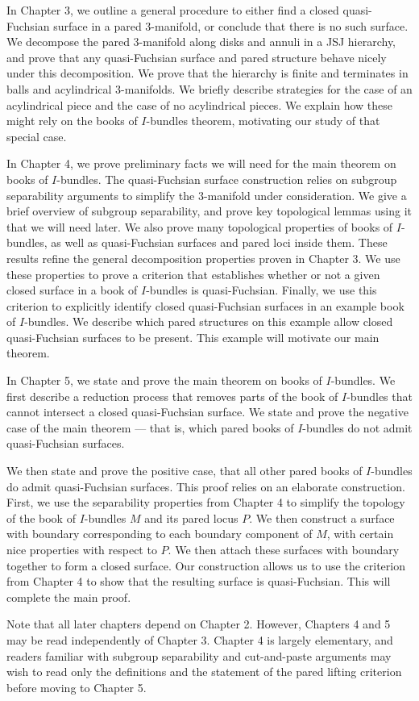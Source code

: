 In Chapter 3, we outline a general procedure to either find a closed
quasi-Fuchsian surface in a pared $3$-manifold, or conclude that there is no
such surface.  We decompose the pared $3$-manifold along disks and annuli in
a JSJ hierarchy, and prove that any quasi-Fuchsian surface and pared structure
behave nicely under this decomposition. We prove that the hierarchy is finite
and terminates in balls and acylindrical $3$-manifolds. We briefly describe
strategies for the case of an acylindrical piece and the case of no
acylindrical pieces. We explain how these might rely on the books of
$I$-bundles theorem, motivating our study of that special case.

In Chapter 4, we prove preliminary facts we will need for the main theorem on
books of $I$-bundles. The quasi-Fuchsian surface construction relies on
subgroup separability arguments to simplify the $3$-manifold under
consideration.  We give a brief overview of subgroup separability, and prove
key topological lemmas using it that we will need later. We also prove many
topological properties of books of $I$-bundles, as well as quasi-Fuchsian
surfaces and pared loci inside them.  These results refine the general
decomposition properties proven in Chapter 3.  We use these properties to prove
a criterion that establishes whether or not a given closed surface in a book of
$I$-bundles is quasi-Fuchsian.  Finally, we use this criterion to explicitly
identify closed quasi-Fuchsian surfaces in an example book of $I$-bundles. We
describe which pared structures on this example allow closed quasi-Fuchsian
surfaces to be present. This example will motivate our main theorem.

In Chapter 5, we state and prove the main theorem on books of $I$-bundles. We
first describe a reduction process that removes parts of the book of
$I$-bundles that cannot intersect a closed quasi-Fuchsian surface. We state and
prove the negative case of the main theorem --- that is, which pared books of
$I$-bundles do not admit quasi-Fuchsian surfaces.

We then state and prove the positive case, that all other pared books of
$I$-bundles do admit quasi-Fuchsian surfaces. This proof relies on an elaborate
construction. First, we use the separability properties from Chapter 4 to
simplify the topology of the book of $I$-bundles $M$ and its pared locus $P$.
We then construct a surface with boundary corresponding to each boundary
component of $M$, with certain nice properties with respect to $P$. We then
attach these surfaces with boundary together to form a closed surface. Our
construction allows us to use the criterion from Chapter 4 to show that the
resulting surface is quasi-Fuchsian. This will complete the main proof.

Note that all later chapters depend on Chapter 2. However, Chapters 4 and 5 may
be read independently of Chapter 3. Chapter 4 is largely elementary, and
readers familiar with subgroup separability and cut-and-paste arguments may
wish to read only the definitions and the statement of the pared lifting
criterion before moving to Chapter 5.
